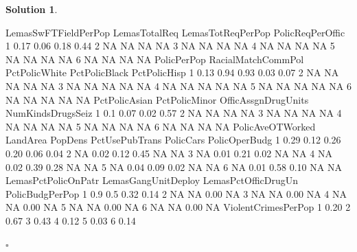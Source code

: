 \documentclass[twoside]{article}
\theoremstyle{definition}
\newtheorem*{solutionT}{Solution}
\newenvironment{solution}{\begin{cBox}\begin{solutionT}}{\hfill{\scriptsize\ensuremath{\square}}\end{solutionT}\end{cBox}}
\theoremstyle{definition}
\begin{document}
\begin{enumerate}
\begin{solution}
\begin{Schunk}
\begin{Soutput}
  LemasSwFTFieldPerPop LemasTotalReq LemasTotReqPerPop PolicReqPerOffic
1                 0.17          0.06              0.18             0.44
2                   NA            NA                NA               NA
3                   NA            NA                NA               NA
4                   NA            NA                NA               NA
5                   NA            NA                NA               NA
6                   NA            NA                NA               NA
  PolicPerPop RacialMatchCommPol PctPolicWhite PctPolicBlack PctPolicHisp
1        0.13               0.94          0.93          0.03         0.07
2          NA                 NA            NA            NA           NA
3          NA                 NA            NA            NA           NA
4          NA                 NA            NA            NA           NA
5          NA                 NA            NA            NA           NA
6          NA                 NA            NA            NA           NA
  PctPolicAsian PctPolicMinor OfficAssgnDrugUnits NumKindsDrugsSeiz
1           0.1          0.07                0.02              0.57
2            NA            NA                  NA                NA
3            NA            NA                  NA                NA
4            NA            NA                  NA                NA
5            NA            NA                  NA                NA
6            NA            NA                  NA                NA
  PolicAveOTWorked LandArea PopDens PctUsePubTrans PolicCars PolicOperBudg
1             0.29     0.12    0.26           0.20      0.06          0.04
2               NA     0.02    0.12           0.45        NA            NA
3               NA     0.01    0.21           0.02        NA            NA
4               NA     0.02    0.39           0.28        NA            NA
5               NA     0.04    0.09           0.02        NA            NA
6               NA     0.01    0.58           0.10        NA            NA
  LemasPctPolicOnPatr LemasGangUnitDeploy LemasPctOfficDrugUn PolicBudgPerPop
1                 0.9                 0.5                0.32            0.14
2                  NA                  NA                0.00              NA
3                  NA                  NA                0.00              NA
4                  NA                  NA                0.00              NA
5                  NA                  NA                0.00              NA
6                  NA                  NA                0.00              NA
  ViolentCrimesPerPop
1                0.20
2                0.67
3                0.43
4                0.12
5                0.03
6                0.14
\end{Soutput}
\end{Schunk}


\end{solution}
\end{enumerate}
\end{document}
